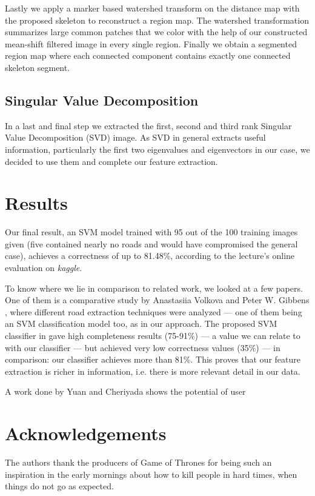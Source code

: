 \documentclass[10pt,conference,compsocconf]{IEEEtran}
\begin{document}
Lastly we apply a marker based watershed transform on the distance map with the proposed skeleton to reconstruct a region map. The watershed transformation summarizes large common patches that we color with the help of our constructed mean-shift filtered image in every single region. Finally we obtain a segmented region map where each connected component contains exactly one connected skeleton segment. 

\subsection{Singular Value Decomposition}

In a last and final step we extracted the first, second and third rank Singular Value Decomposition (SVD) image. As SVD in general extracts useful information, particularly the first two eigenvalues and eigenvectors in our case, we decided to use them and complete our feature extraction.

\section{Results}

Our final result, an SVM model trained with 95 out of the 100 training images given (five contained nearly no roads and would have compromised the general case), achieves a correctness of up to 81.48\%, according to the lecture's online evaluation on \emph{kaggle}.

To know where we lie in comparison to related work, we looked at a few papers. One of them is a comparative study by Anastasiia Volkova and Peter W. Gibbens \cite{VoGi15}, where different road extraction techniques were analyzed --- one of them being an SVM classification model too, as in our approach. The proposed SVM classifier in \cite{VoGi15} gave high completeness results (75-91\%) --- a value we can relate to with our classifier --- but achieved very low correctness values (35\%) --- in comparison: our classifier achieves more than 81\%. This proves that our feature extraction is richer in information, i.e. there is more relevant detail in our data.

A work done by Yuan and Cheriyada \cite{YuCh13} shows the potential of user


\section*{Acknowledgements}
The authors thank the producers of Game of Thrones for being such an inspiration in the early mornings about how to kill people in hard times, when things do not go as expected.



\end{document}
